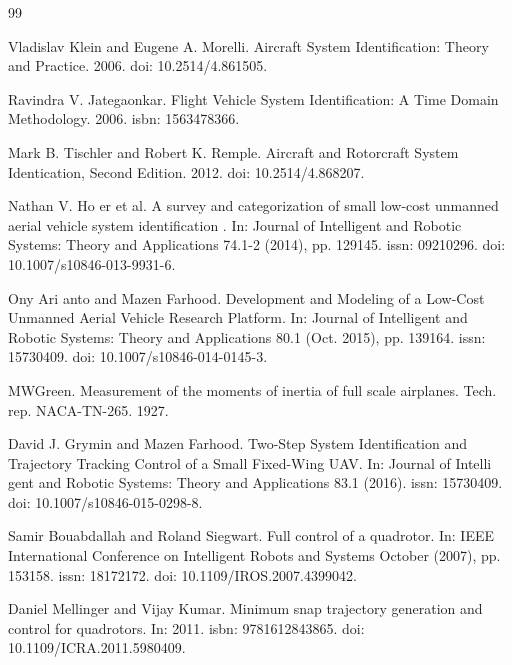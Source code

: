 \documentclass[letterpaper, 10 pt, conference]{ieeeconf}
\begin{document}









\begin{thebibliography}{99}

 Vladislav Klein and Eugene A. Morelli. Aircraft System Identification: Theory and Practice. 2006. doi: 10.2514/4.861505.

 Ravindra V. Jategaonkar. Flight Vehicle System Identification: A Time Domain Methodology. 2006. isbn: 1563478366.

 Mark B. Tischler and Robert K. Remple. Aircraft and Rotorcraft System Identication, Second Edition. 2012. doi: 10.2514/4.868207.

 Nathan V. Ho er et al. A survey and categorization of small low-cost unmanned aerial vehicle system identification . In: Journal of Intelligent and Robotic Systems: Theory and Applications 74.1-2 (2014), pp. 129145. issn: 09210296. doi: 10.1007/s10846-013-9931-6.

 Ony Ari anto and Mazen Farhood. Development and Modeling of a Low-Cost Unmanned Aerial Vehicle Research Platform. In: Journal of Intelligent and Robotic Systems: Theory and Applications 80.1 (Oct. 2015), pp. 139164. issn: 15730409. doi: 10.1007/s10846-014-0145-3.

 MWGreen. Measurement of the moments of inertia of full scale airplanes. Tech. rep. NACA-TN-265. 1927.

 David J. Grymin and Mazen Farhood. Two-Step System Identification and Trajectory Tracking Control of a Small Fixed-Wing UAV. In: Journal of Intelli gent and Robotic Systems: Theory and Applications 83.1 (2016). issn: 15730409. doi: 10.1007/s10846-015-0298-8.

 Samir Bouabdallah and Roland Siegwart. Full control of a quadrotor. In: IEEE International Conference on Intelligent Robots and Systems October (2007), pp. 153158. issn: 18172172. doi: 10.1109/\allowbreak IROS.2007.4399042.

 Daniel Mellinger and Vijay Kumar. Minimum snap trajectory generation and control for quadrotors. In: 2011. isbn: 9781612843865. doi: 10.1109/\allowbreak ICRA.2011.5980409.


\end{thebibliography}
\end{document}
